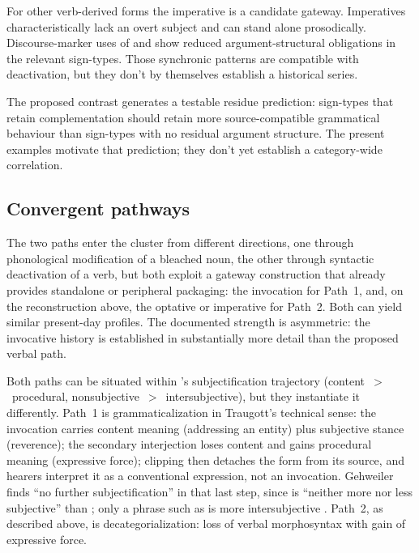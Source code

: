 \documentclass[12pt]{article}
\begin{document}
For other verb-derived forms the imperative is a candidate gateway.
Imperatives characteristically lack an overt subject and can stand alone
prosodically. Discourse-marker uses of  and 
show reduced argument-structural obligations in the relevant sign-types.
Those synchronic patterns are compatible with deactivation, but they don't by
themselves establish a historical series.

The proposed contrast generates a testable residue prediction: sign-types
that retain complementation should retain more source-compatible grammatical
behaviour than sign-types with no residual argument structure. The present
examples motivate that prediction; they don't yet establish a category-wide
correlation.

\subsection{Convergent pathways}

The two paths enter the cluster from different directions, one through
phonological modification of a bleached noun, the other through syntactic
deactivation of a verb, but both exploit a gateway construction that
already provides standalone or peripheral packaging: the invocation for
Path~1, and, on the reconstruction above, the optative or imperative for
Path~2. Both can yield similar present-day profiles. The documented strength
is asymmetric: the invocative history is established in substantially more
detail than the proposed verbal path.

Both paths can be situated within \textcite[40]{TraugottDasher2002}'s
subjectification trajectory (content~$>$~procedural,
nonsubjective~$>$~intersubjective), but they instantiate it differently.
Path~1 is grammaticalization in Traugott's technical sense: the invocation
carries content meaning (addressing an entity) plus subjective stance
(reverence); the secondary interjection loses content and gains procedural
meaning (expressive force); clipping then detaches the form from its source,
and hearers interpret it as a conventional expression, not an invocation.
Gehweiler finds \enquote{no further subjectification} in that last step,
since  is \enquote{neither more nor less subjective} than
; only a phrase such as  is more
intersubjective \citep[88--89]{gehweiler2008}. Path~2, as described above, is
decategorialization: loss of verbal morphosyntax with gain of expressive
force.
\end{document}
